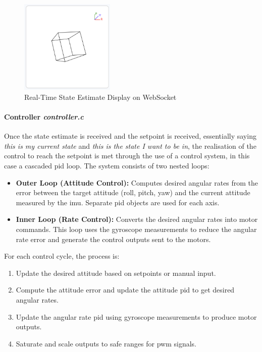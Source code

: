 \begin{figure}[H]
    \centering
    \captionsetup{justification=centering, margin=1cm}
    \includegraphics[width=0.4\textwidth]{img/websocket-state.PNG}
    \caption{Real-Time State Estimate Display on WebSocket}
    \label{fig:ws-state}
\end{figure}

\paragraph{\textbf{Controller} \textit{controller.c}} \leavevmode 

Once the state estimate is received and the setpoint is received, essentially saying \textit{this is my current state} and \textit{this is the state I want to be in}, the realisation of the control to reach the setpoint is met through the use of a control system, in this case a cascaded \gls{pid} loop. The system consists of two nested loops:

\begin{itemize}
    \item \textbf{Outer Loop (Attitude Control):} Computes desired angular rates from the error between the target attitude (roll, pitch, yaw) and the current attitude measured by the \gls{imu}. Separate \gls{pid} objects are used for each axis.
    \item \textbf{Inner Loop (Rate Control):} Converts the desired angular rates into motor commands. This loop uses the gyroscope measurements to reduce the angular rate error and generate the control outputs sent to the motors.
\end{itemize}

For each control cycle, the process is:

\begin{enumerate}
    \item Update the desired attitude based on setpoints or manual input.
    \item Compute the attitude error and update the attitude \gls{pid} to get desired angular rates.
    \item Update the angular rate \gls{pid} using gyroscope measurements to produce motor outputs.
    \item Saturate and scale outputs to safe ranges for \gls{pwm} signals.
\end{enumerate}

